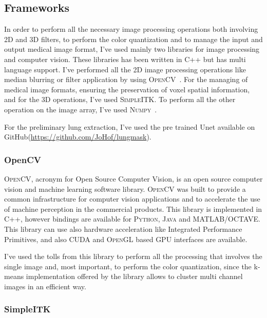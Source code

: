 \documentclass{standalone}
\begin{document}
	
	\subsection{Frameworks}
	
	In order to perform all the necessary image processing operations both involving 2D and 3D filters, to perform the color quantization and to manage the input and output medical image format, I've used mainly two libraries for image processing and computer vision. These libraries has been written in C++ but has multi language support. I've performed all the 2D image processing operations like median blurring or filter application by using \textsc{OpenCV}~\cite{OpenCV}. For the managing of medical image formats, ensuring the preservation of voxel spatial information, and for the 3D operations, I've used \textsc{SimpleITK}.  To perform all the other operation on the image array, I've used \textsc{Numpy}~\cite{Numpy}.
	
	For the preliminary lung extraction, I've used the pre trained Unet available on GitHub(\url{https://github.com/JoHof/lungmask}).
	
	\subsubsection*{OpenCV} 
	
	\textsc{OpenCV}, acronym for Open Source Computer Vision, is an open source computer vision and machine learning software library. \textsc{OpenCV} was built to provide a common infrastructure for computer vision applications and to accelerate the use of machine perception in the commercial products. This library is implemented in C++, however bindings are available for \textsc{Python}, \textsc{Java} and \textsc{MATLAB/OCTAVE}. This library can use also hardware acceleration like Integrated Performance Primitives, and also  \textsc{CUDA} and  \textsc{OpenGL} based  \textsc{GPU} interfaces are available. 
	
	I've used the tolls from this library to perform all the processing that involves the single image and, most important, to perform the color quantization, since the k-means implementation offered by the library allows to cluster multi channel images in an efficient way.
	
	\subsubsection*{SimpleITK} 
	
\end{document}
